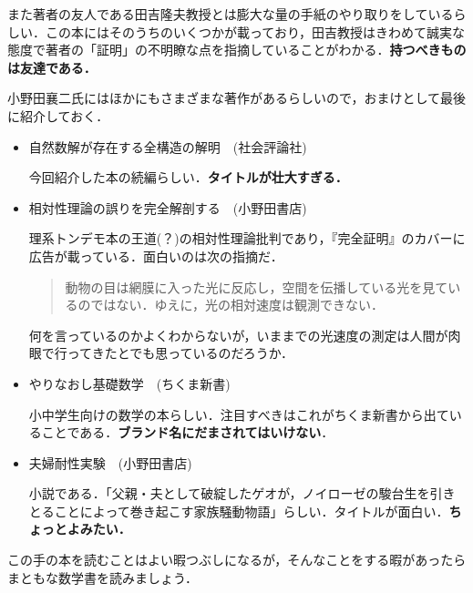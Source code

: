また著者の友人である田吉隆夫教授とは膨大な量の手紙のやり取りをしているらしい．この本にはそのうちのいくつかが載っており，田吉教授はきわめて誠実な態度で著者の「証明」の不明瞭な点を指摘していることがわかる．\textbf{持つべきものは友達である．}



小野田襄二氏にはほかにもさまざまな著作があるらしいので，おまけとして最後に紹介しておく．

\begin{itemize}

\item 自然数解が存在する全構造の解明　(社会評論社)

今回紹介した本の続編らしい．\textbf{タイトルが壮大すぎる．}

\item 相対性理論の誤りを完全解剖する　(小野田書店)

理系トンデモ本の王道(？)の相対性理論批判であり，『完全証明』のカバーに広告が載っている．面白いのは次の指摘だ．

\begin{quote}
動物の目は網膜に入った光に反応し，空間を伝播している光を見ているのではない．ゆえに，光の相対速度は観測できない．
\end{quote}

何を言っているのかよくわからないが，いままでの光速度の測定は人間が肉眼で行ってきたとでも思っているのだろうか．

\item やりなおし基礎数学　(ちくま新書)

小中学生向けの数学の本らしい．注目すべきはこれがちくま新書から出ていることである．\textbf{ブランド名にだまされてはいけない}．

\item 夫婦耐性実験　(小野田書店)

小説である．「父親・夫として破綻したゲオが，ノイローゼの駿台生を引きとることによって巻き起こす家族騒動物語」らしい．タイトルが面白い．\textbf{ちょっとよみたい．}
\end{itemize}



この手の本を読むことはよい暇つぶしになるが，そんなことをする暇があったらまともな数学書を読みましょう．
